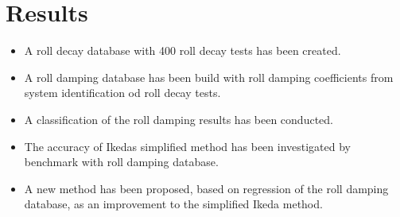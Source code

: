 \section{Results}
\label{se:results}

\begin{itemize}
  \item A roll decay database with 400 roll decay tests has been created.
  \item A roll damping database has been build with roll damping coefficients from system identification od roll decay tests.
  \item A classification of the roll damping results has been conducted.
  \item The accuracy of Ikedas simplified method has been investigated by benchmark with roll damping database.
  \item A new method has been proposed, based on regression of the roll damping database, as an improvement to the simplified Ikeda method.
\end{itemize}

